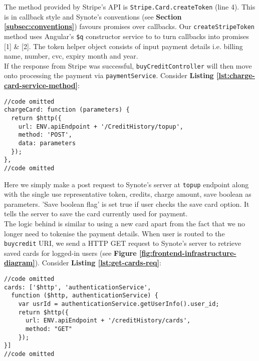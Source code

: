 The method provided by Stripe’s API is \texttt{Stripe.Card.createToken} (line 4). This is in callback style and Synote’s conventions (see \textbf{Section \ref{subsec:conventions}}) favours promises over callbacks. Our \texttt{createStripeToken} method uses Angular’s \texttt{\$q} constructor service to to turn callbacks into promises [1] \& [2]. The token helper object consists of input payment details i.e. billing name, number, cvc, expiry month and year.\\

If the response from Stripe was successful, \texttt{buyCreditController} will then move onto processing the payment via \texttt{paymentService}. Consider \textbf{Listing \ref{lst:charge-card-service-method}}:\\

\begin{listing}[H]
\begin{verbatim}
//code omitted
chargeCard: function (parameters) {
  return $http({
    url: ENV.apiEndpoint + '/CreditHistory/topup',
    method: 'POST',
    data: parameters
  });
},
//code omitted
\end{verbatim}
\label{lst:charge-card-service-method}
\end{listing}

Here we simply make a post request to Synote’s server at \texttt{topup} endpoint along with the single use representative token, credits, charge amount, save boolean as parameters. 'Save boolean flag' is set true if user checks the save card option. It tells the server to save the card currently used for payment.\\

The logic behind is similar to using a new card apart from the fact that we no longer need to tokenise the payment details. When user is routed to the \texttt{buycredit} URI, we send a HTTP GET request to Synote’s server to retrieve saved cards for logged-in users (see \textbf{Figure \ref{fig:frontend-infrastructure-diagram}}). Consider \textbf{Listing \ref{lst:get-cards-req}}:\\

\begin{listing}[H]
\begin{verbatim}
//code omitted
cards: ['$http', 'authenticationService',
  function ($http, authenticationService) {
    var usrId = authenticationService.getUserInfo().user_id;
    return $http({
      url: ENV.apiEndpoint + '/creditHistory/cards',
      method: "GET"
    });
}]
//code omitted
\end{verbatim}
\label{lst:get-cards-req}
\end{listing}

